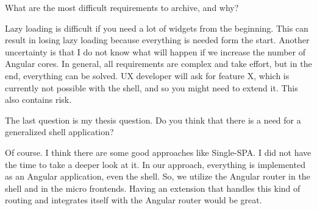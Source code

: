 \begin{description}
    \NicoVogel What are the most difficult requirements to archive, and why?

    \PirminRehm Lazy loading is difficult if you need a lot of widgets from the beginning. This can result in losing lazy loading because everything is needed form the start. Another uncertainty is that I do not know what will happen if we increase the number of Angular cores. In general, all requirements are complex and take effort, but in the end, everything can be solved. UX developer will ask for feature X, which is currently not possible with the shell, and so you might need to extend it. This also contains risk.

    \NicoVogel The last question is my thesis question. Do you think that there is a need for a generalized shell application?

    \PirminRehm Of course. I think there are some good approaches like Single-SPA. I did not have the time to take a deeper look at it. In our approach, everything is implemented as an Angular application, even the shell. So, we utilize the Angular router in the shell and in the micro frontends. Having an extension that handles this kind of routing and integrates itself with the Angular router would be great.

\end{description}

